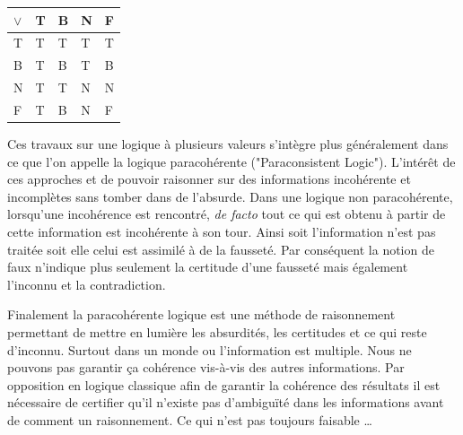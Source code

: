 \begin{refsegment}
\begin{table}[H]
\begin{subtable}{0.35\linewidth}
        \end{subtable}
        \begin{subtable}{0.35\linewidth}
            \centering
            \begin{tabular}{|>{\columncolor{LightCyan}}l|l|l|l|l|}
                \toprule
                \rowcolor{LightCyan}
                $\lor$ & T & B & N & F \\
                \midrule
                T       & T & T & T & T \\ \hline
                B       & T & B & T & B \\ \hline
                N       & T & T & N & N \\ \hline
                F       & T & B & N & F\\
                \bottomrule
            \end{tabular}
        \end{subtable}
    \end{table}

    Ces travaux sur une logique à plusieurs valeurs s'intègre plus généralement dans ce que l'on appelle la logique paracohérente ("Paraconsistent Logic"). L'intérêt de ces approches et de pouvoir raisonner sur des informations incohérente et incomplètes sans tomber dans de l'absurde. Dans une logique non paracohérente, lorsqu'une incohérence est rencontré, \textit{de facto} tout ce qui est obtenu à partir de cette information est incohérente à son tour. Ainsi soit l'information n'est pas traitée soit elle celui est assimilé à de la fausseté. Par conséquent la notion de faux n'indique plus seulement la certitude d'une fausseté mais également l'inconnu et la contradiction.
    
    Finalement la paracohérente logique est une méthode de raisonnement permettant de mettre en lumière les absurdités, les certitudes et ce qui reste d'inconnu. Surtout dans un monde ou l'information est multiple. Nous ne pouvons pas garantir ça cohérence vis-à-vis des autres informations. Par opposition en logique classique afin de garantir la cohérence des résultats il est nécessaire de certifier qu'il n'existe pas d'ambiguïté dans les informations avant de comment un raisonnement. Ce qui n'est pas toujours faisable \ldots
    

\end{refsegment}
